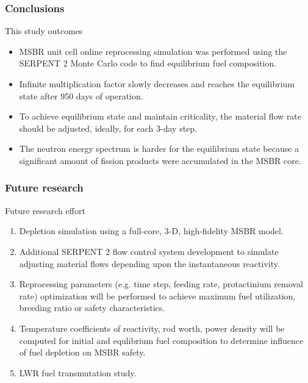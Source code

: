 \begin{frame}
  \frametitle{Conclusions}
        \begin{block}{This study outcomes}
        \begin{itemize}
                \item \gls{MSBR} unit cell online reprocessing simulation was performed using the SERPENT 2 Monte Carlo code to find equilibrium fuel composition.
                \item Infinite multiplication factor slowly decreases and reaches the equilibrium state after 950 days of operation.
                \item To achieve equilibrium state and maintain criticality, the material flow rate should be adjusted, ideally, for each 3-day step.
                \item The neutron energy spectrum is harder for the equilibrium state because a significant amount of fission products were accumulated in the \gls{MSBR} core.
        \end{itemize}
        \end{block}
        
\end{frame}

\begin{frame}
  \frametitle{Future research}
         
              \begin{block}{Future research effort}
                 \begin{enumerate}
                \item Depletion simulation using a full-core, 3-D, high-fidelity MSBR model.
                \item Additional SERPENT 2 flow control system development to simulate adjusting material flows depending upon the instantaneous reactivity.
                \item Reprocessing parameters (e.g. time step, feeding rate, protactinium removal rate) optimization will be performed to achieve maximum fuel utilization, breeding ratio or safety characteristics.
                \item Temperature coefficients of reactivity, rod worth, power density will be computed for initial and equlibrium fuel composition to determine influence of fuel depletion on \gls{MSBR} safety.
                \item \gls{LWR} fuel transmutation study.
               \end{enumerate}
               \end{block}
\end{frame}
